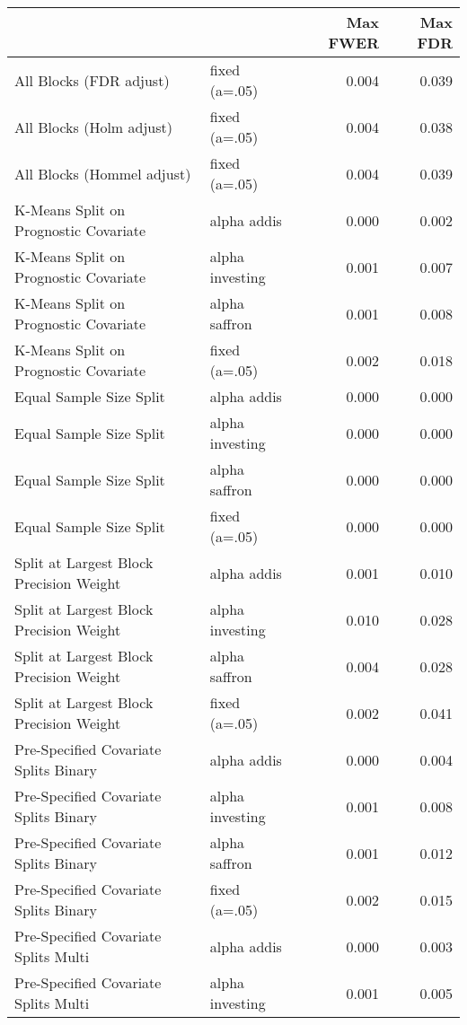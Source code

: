 \begin{table}[H]
\centering
\begin{tabular}{llrr}
  \toprule
 &  & Max FWER & Max FDR \\ 
  \midrule
All Blocks (FDR adjust) & fixed (a=.05) & 0.004 & 0.039 \\ 
  All Blocks (Holm adjust) & fixed (a=.05) & 0.004 & 0.038 \\ 
  All Blocks (Hommel adjust) & fixed (a=.05) & 0.004 & 0.039 \\ 
  K-Means Split on Prognostic Covariate & alpha addis & 0.000 & 0.002 \\ 
  K-Means Split on Prognostic Covariate & alpha investing & 0.001 & 0.007 \\ 
  K-Means Split on Prognostic Covariate & alpha saffron & 0.001 & 0.008 \\ 
  K-Means Split on Prognostic Covariate & fixed (a=.05) & 0.002 & 0.018 \\ 
  Equal Sample Size Split & alpha addis & 0.000 & 0.000 \\ 
  Equal Sample Size Split & alpha investing & 0.000 & 0.000 \\ 
  Equal Sample Size Split & alpha saffron & 0.000 & 0.000 \\ 
  Equal Sample Size Split & fixed (a=.05) & 0.000 & 0.000 \\ 
  Split at Largest Block Precision Weight & alpha addis & 0.001 & 0.010 \\ 
  Split at Largest Block Precision Weight & alpha investing & 0.010 & 0.028 \\ 
  Split at Largest Block Precision Weight & alpha saffron & 0.004 & 0.028 \\ 
  Split at Largest Block Precision Weight & fixed (a=.05) & 0.002 & 0.041 \\ 
  Pre-Specified Covariate Splits Binary & alpha addis & 0.000 & 0.004 \\ 
  Pre-Specified Covariate Splits Binary & alpha investing & 0.001 & 0.008 \\ 
  Pre-Specified Covariate Splits Binary & alpha saffron & 0.001 & 0.012 \\ 
  Pre-Specified Covariate Splits Binary & fixed (a=.05) & 0.002 & 0.015 \\ 
  Pre-Specified Covariate Splits Multi & alpha addis & 0.000 & 0.003 \\ 
  Pre-Specified Covariate Splits Multi & alpha investing & 0.001 & 0.005 \\ 

\end{tabular}
\end{table}
